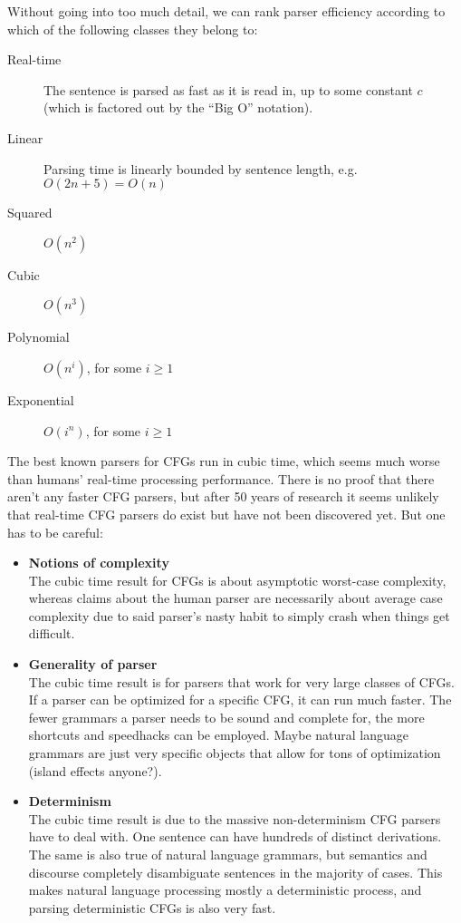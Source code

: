Without going into too much detail, we can rank parser efficiency according to which of the following classes they belong to:
%
\begin{description}
    \item[Real-time]
        The sentence is parsed as fast as it is read in, up to some constant $c$ (which is factored out by the ``Big O'' notation).
    \item[Linear]
        Parsing time is linearly bounded by sentence length, e.g.\ $O(2n+5) = O(n)$
    \item[Squared] $O(n^2)$
    \item[Cubic] $O(n^3)$ 
    \item[Polynomial] $O(n^i)$, for some $i \geq 1$
    \item[Exponential] $O(i^n)$, for some $i \geq 1$
\end{description}
%
The best known parsers for CFGs run in cubic time, which seems much worse than humans' real-time processing performance.
There is no proof that there aren't any faster CFG parsers, but after 50 years of research it seems unlikely that real-time CFG parsers do exist but have not been discovered yet.
But one has to be careful:
%
\begin{itemize}
    \item \textbf{Notions of complexity}\\
        The cubic time result for CFGs is about asymptotic worst-case complexity, whereas claims about the human parser are necessarily about average case complexity due to said parser's nasty habit to simply crash when things get difficult. 
    \item \textbf{Generality of parser}\\
        The cubic time result is for parsers that work for very large classes of CFGs.
        If a parser can be optimized for a specific CFG, it can run much faster.
        The fewer grammars a parser needs to be sound and complete for, the more shortcuts and speedhacks can be employed.
        Maybe natural language grammars are just very specific objects that allow for tons of optimization (island effects anyone?).
    \item \textbf{Determinism}\\
        The cubic time result is due to the massive non-determinism CFG parsers have to deal with.
        One sentence can have hundreds of distinct derivations.
        The same is also true of natural language grammars, but semantics and discourse completely disambiguate sentences in the majority of cases.
        This makes natural language processing mostly a deterministic process, and parsing deterministic CFGs is also very fast.
\end{itemize}





